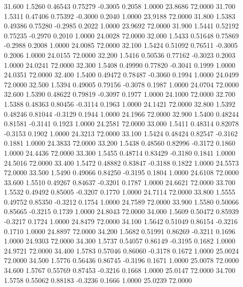   31.600   1.5260   0.46543   0.75279  -0.3005   0.2058   1.0000  23.8686  72.0000
  31.700   1.5311   0.47406   0.75392  -0.3000   0.2040   1.0000  23.9188  72.0000
  31.800   1.5383   0.49386   0.75280  -0.2985   0.2022   1.0000  23.9692  72.0000
  31.900   1.5441   0.52192   0.75235  -0.2970   0.2010   1.0000  24.0028  72.0000
  32.000   1.5433   0.51648   0.75869  -0.2988   0.2008   1.0000  24.0085  72.0000
  32.100   1.5424   0.51092   0.76511  -0.3005   0.2006   1.0000  24.0155  72.0000
  32.200   1.5416   0.50536   0.77162  -0.3023   0.2003   1.0000  24.0241  72.0000
  32.300   1.5408   0.49990   0.77820  -0.3041   0.1999   1.0000  24.0351  72.0000
  32.400   1.5400   0.49472   0.78487  -0.3060   0.1994   1.0000  24.0499  72.0000
  32.500   1.5394   0.49005   0.79156  -0.3078   0.1987   1.0000  24.0704  72.0000
  32.600   1.5390   0.48622   0.79819  -0.3097   0.1977   1.0000  24.1000  72.0000
  32.700   1.5388   0.48363   0.80456  -0.3114   0.1963   1.0000  24.1421  72.0000
  32.800   1.5392   0.48246   0.81044  -0.3129   0.1944   1.0000  24.1966  72.0000
  32.900   1.5400   0.48244   0.81581  -0.3141   0.1923   1.0000  24.2581  72.0000
  33.000   1.5411   0.48314   0.82078  -0.3153   0.1902   1.0000  24.3213  72.0000
  33.100   1.5424   0.48424   0.82547  -0.3162   0.1881   1.0000  24.3833  72.0000
  33.200   1.5438   0.48560   0.82996  -0.3172   0.1860   1.0000  24.4436  72.0000
  33.300   1.5455   0.48714   0.83429  -0.3180   0.1841   1.0000  24.5016  72.0000
  33.400   1.5472   0.48882   0.83847  -0.3188   0.1822   1.0000  24.5573  72.0000
  33.500   1.5490   0.49066   0.84250  -0.3195   0.1804   1.0000  24.6108  72.0000
  33.600   1.5510   0.49267   0.84637  -0.3201   0.1787   1.0000  24.6621  72.0000
  33.700   1.5532   0.49492   0.85005  -0.3207   0.1770   1.0000  24.7114  72.0000
  33.800   1.5555   0.49752   0.85350  -0.3212   0.1754   1.0000  24.7589  72.0000
  33.900   1.5580   0.50066   0.85665  -0.3215   0.1739   1.0000  24.8043  72.0000
  34.000   1.5609   0.50472   0.85939  -0.3217   0.1724   1.0000  24.8479  72.0000
  34.100   1.5642   0.51049   0.86154  -0.3216   0.1710   1.0000  24.8897  72.0000
  34.200   1.5682   0.51991   0.86269  -0.3211   0.1696   1.0000  24.9303  72.0000
  34.300   1.5737   0.54057   0.86149  -0.3195   0.1682   1.0000  24.9721  72.0000
  34.400   1.5783   0.57046   0.86060  -0.3178   0.1672   1.0000  25.0024  72.0000
  34.500   1.5776   0.56436   0.86745  -0.3196   0.1671   1.0000  25.0078  72.0000
  34.600   1.5767   0.55769   0.87453  -0.3216   0.1668   1.0000  25.0147  72.0000
  34.700   1.5758   0.55062   0.88183  -0.3236   0.1666   1.0000  25.0239  72.0000
